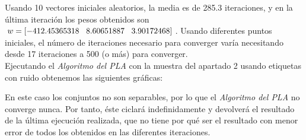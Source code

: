 \documentclass{article}
\begin{document}
Usando 10 vectores iniciales aleatorios, la media es de 285.3 iteraciones, y en la última iteración los pesos obtenidos son $w = [ -412.45365318 \hspace{3mm} 8.60651887 \hspace{3mm} 3.90172468]$. Usando diferentes puntos iniciales, el número de iteraciones necesario para converger varía necesitando desde 17 iteraciones a 500 (o más) para converger.\\

Ejecutando el \textit{Algoritmo del PLA} con la muestra del apartado  2 usando etiquetas con ruido obtenemos las siguientes gráficas:

\begin{figure}[H]
  \centering
\end{figure}

En este caso los conjuntos no son separables, por lo que el \textit{Algoritmo del PLA} no converge nunca. Por tanto, éste ciclará indefinidamente y devolverá el resultado de la última ejecución realizada, que no tiene por qué ser el resultado con menor error de todos los obtenidos en las diferentes iteraciones. 
\end{document}
